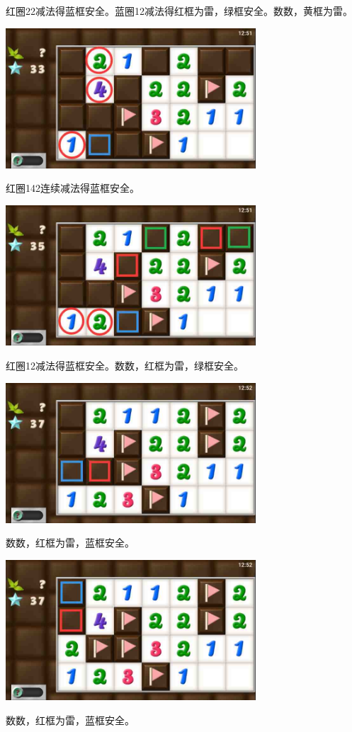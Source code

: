 红圈22减法得蓝框安全。蓝圈12减法得红框为雷，绿框安全。数数，黄框为雷。
\begin{center}
    \includegraphics[width=0.7\textwidth]{puzzlelow/226-5.jpg}
\end{center}
红圈142连续减法得蓝框安全。
\begin{center}
    \includegraphics[width=0.7\textwidth]{puzzlelow/226-6.jpg}
\end{center}
红圈12减法得蓝框安全。数数，红框为雷，绿框安全。
\begin{center}
    \includegraphics[width=0.7\textwidth]{puzzlelow/226-7.jpg}
\end{center}
数数，红框为雷，蓝框安全。
\begin{center}
    \includegraphics[width=0.7\textwidth]{puzzlelow/226-8.jpg}
\end{center}
数数，红框为雷，蓝框安全。


